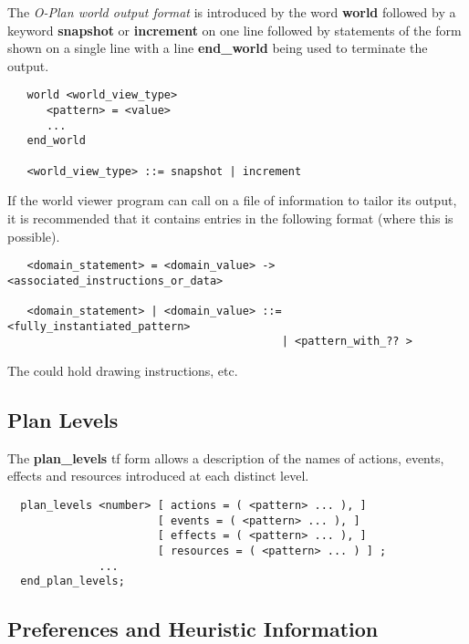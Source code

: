 The {\em O-Plan world output format} is introduced by the word {\bf world}
followed by a keyword {\bf snapshot} or {\bf increment} on one line
followed by statements of the form shown on a single line with a line {\bf
end\_world} being used to terminate the output.

\begin{verbatim}
   world <world_view_type>
      <pattern> = <value>
      ...
   end_world

   <world_view_type> ::= snapshot | increment
\end{verbatim}

If the world viewer program can call on a file of information to tailor
its output, it is recommended that it contains entries in the following format
(where this is possible).

\begin{verbatim}
   <domain_statement> = <domain_value> -> <associated_instructions_or_data>

   <domain_statement> | <domain_value> ::=  <fully_instantiated_pattern>
                                          | <pattern_with_?? >
\end{verbatim}

The  could hold drawing instructions,
etc.

\subsection{Plan Levels}

The {\bf plan\_levels} {\sc tf} form allows a description of the names of
actions, events, effects and resources introduced at each distinct level.

\begin{verbatim}
  plan_levels <number> [ actions = ( <pattern> ... ), ]
                       [ events = ( <pattern> ... ), ]
                       [ effects = ( <pattern> ... ), ]
                       [ resources = ( <pattern> ... ) ] ;
              ...
  end_plan_levels;
\end{verbatim}

\subsection{Preferences and Heuristic Information}

